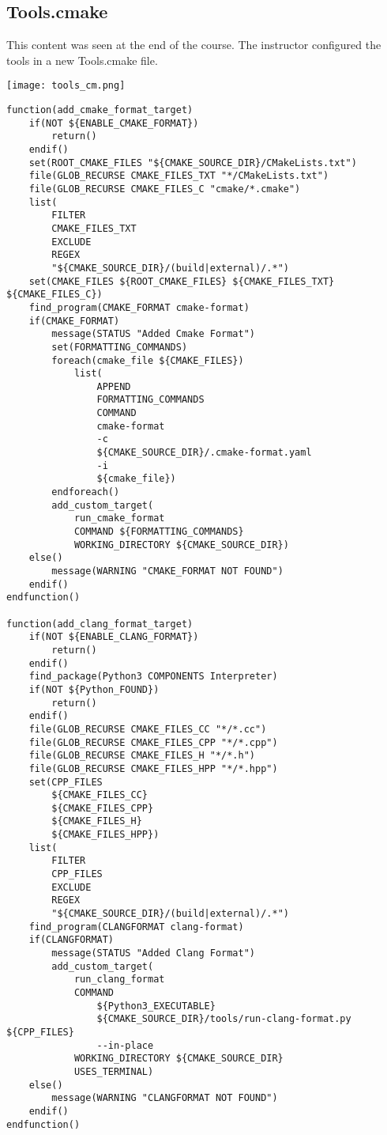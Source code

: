 \documentclass[openany]{report}
\begin{document}
\subsection{Tools.cmake}


This content was seen at the end of the course. The instructor configured the tools in a new Tools.cmake file.


\begin{center}
    \texttt{[image: tools\_cm.png]}
\end{center}


\begin{verbatim}
function(add_cmake_format_target)
    if(NOT ${ENABLE_CMAKE_FORMAT})
        return()
    endif()
    set(ROOT_CMAKE_FILES "${CMAKE_SOURCE_DIR}/CMakeLists.txt")
    file(GLOB_RECURSE CMAKE_FILES_TXT "*/CMakeLists.txt")
    file(GLOB_RECURSE CMAKE_FILES_C "cmake/*.cmake")
    list(
        FILTER
        CMAKE_FILES_TXT
        EXCLUDE
        REGEX
        "${CMAKE_SOURCE_DIR}/(build|external)/.*")
    set(CMAKE_FILES ${ROOT_CMAKE_FILES} ${CMAKE_FILES_TXT} ${CMAKE_FILES_C})
    find_program(CMAKE_FORMAT cmake-format)
    if(CMAKE_FORMAT)
        message(STATUS "Added Cmake Format")
        set(FORMATTING_COMMANDS)
        foreach(cmake_file ${CMAKE_FILES})
            list(
                APPEND
                FORMATTING_COMMANDS
                COMMAND
                cmake-format
                -c
                ${CMAKE_SOURCE_DIR}/.cmake-format.yaml
                -i
                ${cmake_file})
        endforeach()
        add_custom_target(
            run_cmake_format
            COMMAND ${FORMATTING_COMMANDS}
            WORKING_DIRECTORY ${CMAKE_SOURCE_DIR})
    else()
        message(WARNING "CMAKE_FORMAT NOT FOUND")
    endif()
endfunction()

function(add_clang_format_target)
    if(NOT ${ENABLE_CLANG_FORMAT})
        return()
    endif()
    find_package(Python3 COMPONENTS Interpreter)
    if(NOT ${Python_FOUND})
        return()
    endif()
    file(GLOB_RECURSE CMAKE_FILES_CC "*/*.cc")
    file(GLOB_RECURSE CMAKE_FILES_CPP "*/*.cpp")
    file(GLOB_RECURSE CMAKE_FILES_H "*/*.h")
    file(GLOB_RECURSE CMAKE_FILES_HPP "*/*.hpp")
    set(CPP_FILES
        ${CMAKE_FILES_CC}
        ${CMAKE_FILES_CPP}
        ${CMAKE_FILES_H}
        ${CMAKE_FILES_HPP})
    list(
        FILTER
        CPP_FILES
        EXCLUDE
        REGEX
        "${CMAKE_SOURCE_DIR}/(build|external)/.*")
    find_program(CLANGFORMAT clang-format)
    if(CLANGFORMAT)
        message(STATUS "Added Clang Format")
        add_custom_target(
            run_clang_format
            COMMAND
                ${Python3_EXECUTABLE}
                ${CMAKE_SOURCE_DIR}/tools/run-clang-format.py ${CPP_FILES}
                --in-place
            WORKING_DIRECTORY ${CMAKE_SOURCE_DIR}
            USES_TERMINAL)
    else()
        message(WARNING "CLANGFORMAT NOT FOUND")
    endif()
endfunction()


\end{verbatim}
\end{document}
